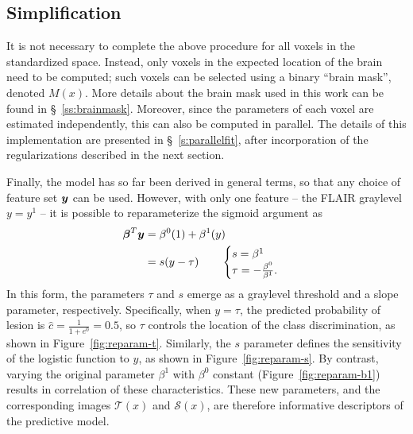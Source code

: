 \subsection{Simplification}\label{ss:vlr-simple}
It is not necessary to complete the above procedure for all voxels in the standardized space.
Instead, only voxels in the expected location of the brain need to be computed;
such voxels can be selected using a binary ``brain mask'', denoted $M(x)$.
More details about the brain mask used in this work can be found in \S~\ref{ss:brainmask}.
Moreover, since the parameters of each voxel are estimated independently,
this can also be computed in parallel.
The details of this implementation are presented in \S~\ref{s:parallelfit},
after incorporation of the regularizations described in the next section.
\par
Finally, the model has so far been derived in general terms,
so that any choice of feature set $\bm{y}$ can be used.
However, with only one feature -- the FLAIR graylevel $y = y^1$ --
it is possible to reparameterize the sigmoid argument as
\begin{align}
  \bb^T\by &= \b^0(1) + \b^1(y)\nonumber\\
           &= s(y-\tau)
           \qquad\begin{cases}
             s = \b^1\\
             \tau = -\frac{\b^0}{\b^1}.
           \end{cases}%
  \label{eq:reparameterize}
\end{align}
In this form, the parameters $\tau$ and $s$ emerge
as a graylevel threshold and a slope parameter, respectively.
Specifically, when $y = \tau$,
the predicted probability of lesion is $\hat{c} = \tfrac{1}{1+e^{0}} = 0.5$,
so $\tau$ controls the location of the class discrimination,
as shown in Figure~\ref{fig:reparam-t}.
Similarly, the $s$ parameter defines the sensitivity of the logistic function to $y$,
as shown in Figure~\ref{fig:reparam-s}.
By contrast, varying the original parameter $\beta^1$ with $\beta^0$ constant
(Figure~\ref{fig:reparam-b1}) results in correlation of these characteristics.
These new parameters, and the corresponding images $\mathcal{T}(x)$ and $\mathcal{S}(x)$,
are therefore informative descriptors of the predictive model.
